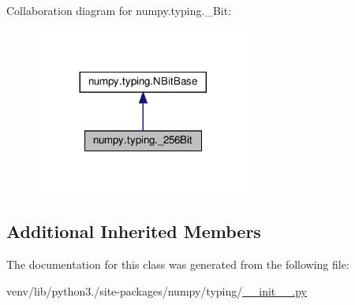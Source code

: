 Collaboration diagram for numpy.\+typing.\+\_\+Bit\+:
\nopagebreak
\begin{figure}[H]
\begin{center}
\leavevmode
\includegraphics[width=200pt]{classnumpy_1_1typing_1_1__256Bit__coll__graph}
\end{center}
\end{figure}
\subsection*{Additional Inherited Members}


The documentation for this class was generated from the following file\+:\begin{DoxyCompactItemize}
\item 
venv/lib/python3./site-\/packages/numpy/typing/\hyperlink{venv_2lib_2python3_89_2site-packages_2numpy_2typing_2____init_____8py}{\+\_\+\+\_\+init\+\_\+\+\_\+.\+py}\end{DoxyCompactItemize}
